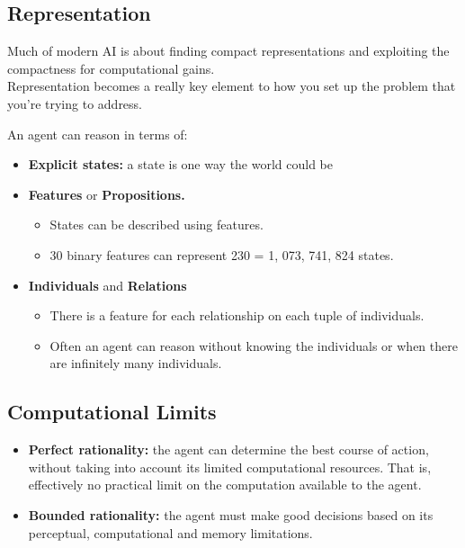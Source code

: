 \documentclass[12pt]{article}
\begin{document}
\subsection*{Representation}
Much of modern AI is about finding compact representations and exploiting the compactness for computational gains.\\
\noindent Representation becomes a really key element to how you set up the problem that you're trying to address.

\noindent An agent can reason in terms of:

\begin{itemize}
    \item \textbf{Explicit states:} a state is one way the world could be
    \item \textbf{Features} or \textbf{Propositions.}
    \begin{itemize}
        \item States can be described using features.
        \item 30 binary features can represent 230 = 1, 073, 741, 824 states.
    \end{itemize}
    \item \textbf{Individuals} and \textbf{Relations}
    \begin{itemize}
        \items Are we dealing with an individual agent or are we dealing with relations {couldn't understand the word} between or are we dealing with abstract representations of agents that just comes across like an individual agent.  
        \item There is a feature for each relationship on each tuple of individuals.
        \item Often an agent can reason without knowing the individuals or when there are infinitely many
individuals.
    \end{itemize}
\end{itemize}

\subsection*{Computational Limits}

\begin{itemize}
    \item \textbf{Perfect rationality:} the agent can determine the best course of action, without taking
into account its limited computational resources. That is, effectively no practical limit on the computation available to the agent.
    \item \textbf{Bounded rationality:} the agent must make good decisions based on its perceptual,
computational and memory limitations.
\end{itemize}
\end{document}
